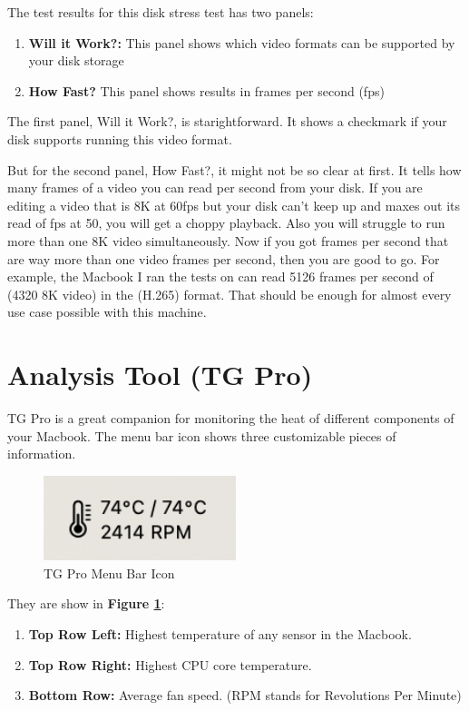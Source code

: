 \documentclass[a4paper]{article}
\begin{document}
The test results for this disk stress test has two panels:

\begin{enumerate}
    \item \textbf{Will it Work?:} This panel shows which video formats can be supported by your disk storage
    \item \textbf{How Fast?} This panel shows results in frames per second (fps)
\end{enumerate}

The first panel, Will it Work?, is starightforward. It shows a checkmark if your disk supports running this video format.

But for the second panel, How Fast?, it might not be so clear at first. It tells how many frames of a video you can read per second from your disk. If you are editing a video that is 8K at 60fps but your disk can't keep up and maxes out its read of fps at 50, you will get a choppy playback. Also you will struggle to run more than one 8K video simultaneously. Now if you got frames per second that are way more than one video frames per second, then you are good to go. For example, the Macbook I ran the tests on can read 5126 frames per second of (4320 8K video) in the (H.265) format. That should be enough for almost every use case possible with this machine.

\section{Analysis Tool (TG Pro)}

TG Pro is a great companion for monitoring the heat of different components of your Macbook. The menu bar icon shows three customizable pieces of information.
 
\begin{figure}[h!]
    \centering
    \includegraphics[width=0.5\textwidth]{images/tgpro-menu-bar.png}
    \caption{TG Pro Menu Bar Icon}
    \label{fig:tgpro-menu-bar}
\end{figure}

They are show in \textbf{Figure \ref{fig:tgpro-menu-bar}}:
\begin{enumerate}
    \item \textbf{Top Row Left:} Highest temperature of any sensor in the Macbook.
    \item \textbf{Top Row Right:} Highest CPU core temperature.
    \item \textbf{Bottom Row:} Average fan speed. (RPM stands for Revolutions Per Minute)
\end{enumerate}
\end{document}
